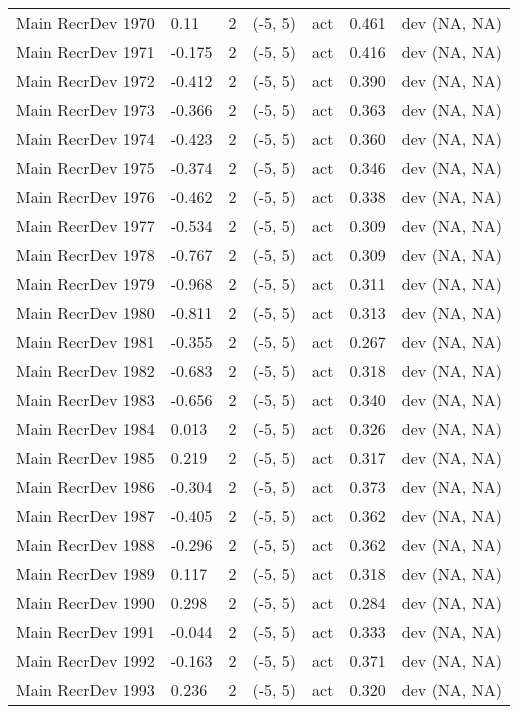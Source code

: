 \documentclass[11pt,
  english,
  letterpaper,
]{article}
\begin{document}
\begin{landscape}
\begin{longtable}[t]{>{\raggedright\arraybackslash}p{7.5cm}lllll>{\raggedright\arraybackslash}p{3.5cm}}
Main RecrDev 1970 & 0.11 & 2 & (-5, 5) & act & 0.461 & dev (NA, NA)\\
Main RecrDev 1971 & -0.175 & 2 & (-5, 5) & act & 0.416 & dev (NA, NA)\\
Main RecrDev 1972 & -0.412 & 2 & (-5, 5) & act & 0.390 & dev (NA, NA)\\
Main RecrDev 1973 & -0.366 & 2 & (-5, 5) & act & 0.363 & dev (NA, NA)\\
Main RecrDev 1974 & -0.423 & 2 & (-5, 5) & act & 0.360 & dev (NA, NA)\\
Main RecrDev 1975 & -0.374 & 2 & (-5, 5) & act & 0.346 & dev (NA, NA)\\
Main RecrDev 1976 & -0.462 & 2 & (-5, 5) & act & 0.338 & dev (NA, NA)\\
Main RecrDev 1977 & -0.534 & 2 & (-5, 5) & act & 0.309 & dev (NA, NA)\\
Main RecrDev 1978 & -0.767 & 2 & (-5, 5) & act & 0.309 & dev (NA, NA)\\
Main RecrDev 1979 & -0.968 & 2 & (-5, 5) & act & 0.311 & dev (NA, NA)\\
Main RecrDev 1980 & -0.811 & 2 & (-5, 5) & act & 0.313 & dev (NA, NA)\\
Main RecrDev 1981 & -0.355 & 2 & (-5, 5) & act & 0.267 & dev (NA, NA)\\
Main RecrDev 1982 & -0.683 & 2 & (-5, 5) & act & 0.318 & dev (NA, NA)\\
Main RecrDev 1983 & -0.656 & 2 & (-5, 5) & act & 0.340 & dev (NA, NA)\\
Main RecrDev 1984 & 0.013 & 2 & (-5, 5) & act & 0.326 & dev (NA, NA)\\
Main RecrDev 1985 & 0.219 & 2 & (-5, 5) & act & 0.317 & dev (NA, NA)\\
Main RecrDev 1986 & -0.304 & 2 & (-5, 5) & act & 0.373 & dev (NA, NA)\\
Main RecrDev 1987 & -0.405 & 2 & (-5, 5) & act & 0.362 & dev (NA, NA)\\
Main RecrDev 1988 & -0.296 & 2 & (-5, 5) & act & 0.362 & dev (NA, NA)\\
Main RecrDev 1989 & 0.117 & 2 & (-5, 5) & act & 0.318 & dev (NA, NA)\\
Main RecrDev 1990 & 0.298 & 2 & (-5, 5) & act & 0.284 & dev (NA, NA)\\
Main RecrDev 1991 & -0.044 & 2 & (-5, 5) & act & 0.333 & dev (NA, NA)\\
Main RecrDev 1992 & -0.163 & 2 & (-5, 5) & act & 0.371 & dev (NA, NA)\\
Main RecrDev 1993 & 0.236 & 2 & (-5, 5) & act & 0.320 & dev (NA, NA)\\

\end{longtable}
\end{landscape}
\end{document}
